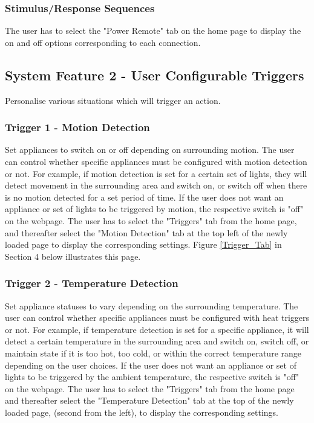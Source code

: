 \documentclass[11pt, a4paper]{article}
\newcounter{subsubsubsection}[subsubsection]
\begin{document}
	\subsubsection{Stimulus/Response Sequences}
	The user has to select the "Power Remote" tab on the home page to display the on and off options corresponding to each connection. 
	
	\subsection{System Feature 2 - User Configurable Triggers} 
	Personalise various situations which will trigger an action.
	\subsubsection{Trigger 1 - Motion Detection}
	Set appliances to switch on or off depending on surrounding motion. 
	The user can control whether specific appliances must be configured with motion detection or not. For example, if motion detection is set for a certain set of lights, they will detect movement in the surrounding area and switch on, or switch off when there is no motion detected for a set period of time. If the user does not want an appliance or set of lights to be triggered by motion, the respective switch is "off" on the webpage. 
	The user has to select the "Triggers" tab from the home page, and thereafter select the "Motion Detection" tab at the top left of the newly loaded page to display the corresponding settings. Figure \ref{Trigger_Tab} in Section 4 below illustrates this page. 
	\subsubsection{Trigger 2 - Temperature Detection}
	Set appliance statuses to vary depending on the surrounding temperature.
	The user can control whether specific appliances must be configured with heat triggers or not. For example, if temperature detection is set for a specific appliance, it will detect a certain temperature in the surrounding area and switch on, switch off, or maintain state if it is too hot, too cold, or within the correct temperature range depending on the user choices. If the user does not want an appliance or set of lights to be triggered by the ambient temperature, the respective switch is "off" on the webpage. 
	The user has to select the "Triggers" tab from the home page and thereafter select the "Temperature Detection" tab at the top of the newly loaded page, (second from the left), to display the corresponding settings.
\end{document}
